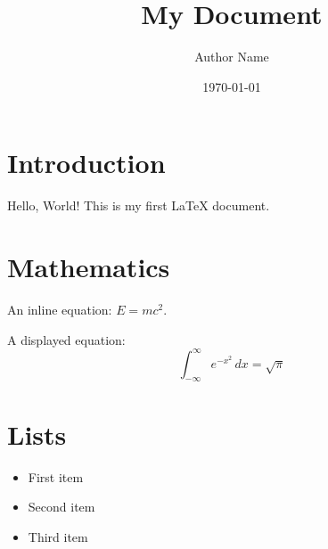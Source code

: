 \documentclass{article}
\title{My Document}
\author{Author Name}
\date{\today}
\begin{document}
\maketitle

\section{Introduction}
Hello, World! This is my first \LaTeX{} document.

\section{Mathematics}
An inline equation: $E = mc^2$.

A displayed equation:
\begin{equation}
  \int_{-\infty}^{\infty} e^{-x^2}\,dx = \sqrt{\pi}
\end{equation}

\section{Lists}
\begin{itemize}
  \item First item
  \item Second item
  \item Third item
\end{itemize}
\end{document}
